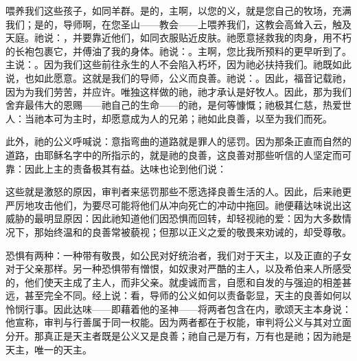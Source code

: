 喂养我们这些孩子，如同羊群。是的，主啊，以您的义，就是您自己的牧场，充满我们；是的，导师啊，在您圣山——教会——上喂养我们，这教会高耸入云，触及天庭。祂说：，并要靠近他们，如同衣服贴近皮肤。祂愿意拯救我的肉身，用不朽的长袍包裹它，并傅油了我的身体。祂说：。主啊，您比我所预料的更早听到了。主说：。因为我们这些前往永生的人不会陷入朽坏，因为祂必扶持我们。祂既如此说，也如此愿意。这就是我们的导师，公义而良善。祂说：。因此，福音记载祂，因为为我们劳苦，并应许。唯独这样做的祂，祂才承认是好牧人。因此，那为我们舍弃最伟大的恩赐——祂自己的生命——的祂，是何等慷慨；祂极其仁慈，热爱世人：当祂本可为主时，却愿意成为人的兄弟；祂如此良善，以至为我们而死。\par

此外，祂的公义呼喊说：意指弯曲的道路就是罪人的惩罚。因为那条正直而自然的道路，由耶稣名字中的所指示的，就是祂的良善，这良善对那些听信的人坚定而可靠：因此上主的责备极其有益。达味也论到他们说：\par

这些就是激怒的原因，审判者来惩罚那些不愿选择良善生活的人。因此，后来祂更严厉地攻击他们，为要尽可能将他们从冲向死亡的冲动中拖回。祂便藉达味说出这威胁的最明显原因：因此祂知道他们因恐惧而回转，却轻视祂的爱：因为大多数情况下，那始终温和的良善常被藐视；但那以正义之爱的敬畏来劝诫的，却受尊敬。\par

恐惧有两种：一种带有敬畏，如公民对好统治者，我们对于天主，以及正直的子女对于父亲那样。另一种恐惧带有憎恨，如奴隶对严酷的主人，以及希伯来人所感受的，他们使天主成了主人，而非父亲。就虔诚而言，自愿和自发的与强迫的相差甚远，甚至完全不同。经上说：看，导师的公义如何以责备彰显，天主的良善如何以怜悯行事。因此达味——即藉着他的圣神——将两者包含在内，歌颂天主本身说：他宣称，审判与行善属于同一权能。因为两者都在于权能，审判将公义与其对立面分开。那真正是天主者既是公义又是良善；祂自己是万有，万有也是祂；因为祂是天主，唯一的天主。\par


